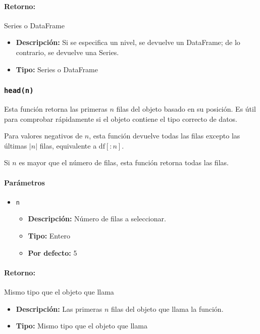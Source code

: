         \paragraph{Retorno:} Series o DataFrame
        \begin{itemize}
            \item \textbf{Descripción:} Si se especifica un nivel, se devuelve un DataFrame; de lo contrario, se devuelve una Series.
            \item \textbf{Tipo:} Series o DataFrame
        \end{itemize}






        \subsubsection{\texttt{head(n)}} Esta función retorna las primeras \( n \) filas del objeto basado en su posición. Es útil para comprobar rápidamente si el objeto contiene el tipo correcto de datos.

        Para valores negativos de \( n \), esta función devuelve todas las filas excepto las últimas \( |n| \) filas, equivalente a \( \text{df}[:n] \).

        Si \( n \) es mayor que el número de filas, esta función retorna todas las filas.

        \paragraph{\textbf{Parámetros}}
        \begin{itemize}
            \item \texttt{n}
                \begin{itemize}
                    \item \textbf{Descripción:} Número de filas a seleccionar.
                    \item \textbf{Tipo:} Entero
                    \item \textbf{Por defecto:} 5
                \end{itemize}
        \end{itemize}

        \paragraph{Retorno:} Mismo tipo que el objeto que llama
        \begin{itemize}
            \item \textbf{Descripción:} Las primeras \( n \) filas del objeto que llama la función.
            \item \textbf{Tipo:} Mismo tipo que el objeto que llama
        \end{itemize}


